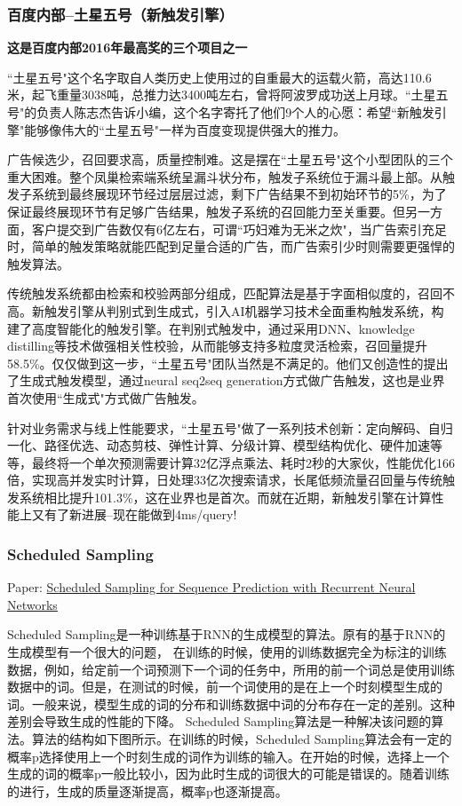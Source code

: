 \documentclass[UTF8,10pt,a4paper]{ctexbook}
\begin{document}
\subsubsection{百度内部--土星五号（新触发引擎）}
\textbf{这是百度内部2016年最高奖的三个项目之一}

``土星五号"这个名字取自人类历史上使用过的自重最大的运载火箭，高达110.6米，起飞重量3038吨，总推力达3400吨左右，曾将阿波罗成功送上月球。``土星五号"的负责人陈志杰告诉小编，这个名字寄托了他们9个人的心愿：希望``新触发引擎"能够像伟大的``土星五号"一样为百度变现提供强大的推力。

广告候选少，召回要求高，质量控制难。这是摆在``土星五号"这个小型团队的三个重大困难。整个凤巢检索端系统呈漏斗状分布，触发子系统位于漏斗最上部。从触发子系统到最终展现环节经过层层过滤，剩下广告结果不到初始环节的5\%，为了保证最终展现环节有足够广告结果，触发子系统的召回能力至关重要。但另一方面，客户提交到广告数仅有6亿左右，可谓``巧妇难为无米之炊"，当广告索引充足时，简单的触发策略就能匹配到足量合适的广告，而广告索引少时则需要更强悍的触发算法。

传统触发系统都由检索和校验两部分组成，匹配算法是基于字面相似度的，召回不高。新触发引擎从判别式到生成式，引入AI机器学习技术全面重构触发系统，构建了高度智能化的触发引擎。在判别式触发中，通过采用DNN、knowledge distilling等技术做强相关性校验，从而能够支持多粒度灵活检索，召回量提升58.5\%。仅仅做到这一步，``土星五号"团队当然是不满足的。他们又创造性的提出了生成式触发模型，通过neural seq2seq generation方式做广告触发，这也是业界首次使用``生成式"方式做广告触发。 

针对业务需求与线上性能要求，``土星五号"做了一系列技术创新：定向解码、自归一化、路径优选、动态剪枝、弹性计算、分级计算、模型结构优化、硬件加速等等，最终将一个单次预测需要计算32亿浮点乘法、耗时2秒的大家伙，性能优化166倍，实现高并发实时计算，日处理33亿次搜索请求，长尾低频流量召回量与传统触发系统相比提升101.3\%，这在业界也是首次。而就在近期，新触发引擎在计算性能上又有了新进展--现在能做到4ms/query!


\subsubsection{Scheduled Sampling}
Paper: \href{https://arxiv.org/pdf/1506.03099.pdf}{Scheduled Sampling for Sequence Prediction with Recurrent Neural Networks}

Scheduled Sampling是一种训练基于RNN的生成模型的算法。原有的基于RNN的生成模型有一个很大的问题， 在训练的时候，使用的训练数据完全为标注的训练数据，例如，给定前一个词预测下一个词的任务中，所用的前一个词总是使用训练数据中的词。但是，在测试的时候，前一个词使用的是在上一个时刻模型生成的词。一般来说，模型生成的词的分布和训练数据中词的分布存在一定的差别。这种差别会导致生成的性能的下降。
Scheduled Sampling算法是一种解决该问题的算法。算法的结构如下图所示。在训练的时候，Scheduled Sampling算法会有一定的概率p选择使用上一个时刻生成的词作为训练的输入。在开始的时候，选择上一个生成的词的概率p一般比较小，因为此时生成的词很大的可能是错误的。随着训练的进行，生成的质量逐渐提高，概率p也逐渐提高。
\end{document}
